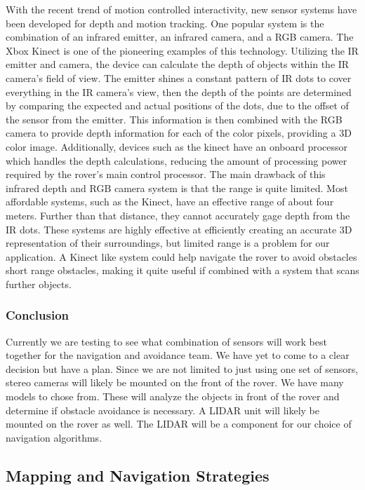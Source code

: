 \documentclass[10pt, oneside,onecolumn]{IEEEtran}
\begin{document}
\begin{titlepage}
With the recent trend of motion controlled interactivity, new sensor systems have been developed for depth and motion tracking. One popular system is the combination of an infrared emitter, an infrared camera, and a RGB camera. The Xbox Kinect is one of the pioneering examples of this technology. Utilizing the IR emitter and camera, the device can calculate the depth of objects within the IR camera's field of view. The emitter shines a constant pattern of IR dots to cover everything in the IR camera's view, then the depth of the points are determined by comparing the expected and actual positions of the dots, due to the offset of the sensor from the emitter. This information is then combined with the RGB camera to provide depth information for each of the color pixels, providing a 3D color image. Additionally, devices such as the kinect have an onboard processor which handles the depth calculations, reducing the amount of processing power required by the rover's main control processor.
The main drawback of this infrared depth and RGB camera system is that the range is quite limited. Most affordable systems, such as the Kinect, have an effective range of about four meters. Further than that distance, they cannot accurately gage depth from the IR dots. These systems are highly effective at efficiently creating an accurate 3D representation of their surroundings, but limited range is a problem for our application. A Kinect like system could help navigate the rover to avoid obstacles short range obstacles, making it quite useful if combined with a system that scans further objects. 

\subsubsection{Conclusion}
 	Currently we are testing to see what combination of sensors will work best together for the navigation and avoidance team. We have yet to come to a clear decision but have a plan. Since we are not limited to just using one set of sensors, stereo cameras will likely be mounted on the front of the rover. We have many models to chose from. These will analyze the objects in front of the rover and determine if obstacle avoidance is necessary. A LIDAR unit will likely be mounted on the rover as well. The LIDAR will be a component for our choice of navigation algorithms.

\subsection{Mapping and Navigation Strategies} 


\end{titlepage}
\end{document}

